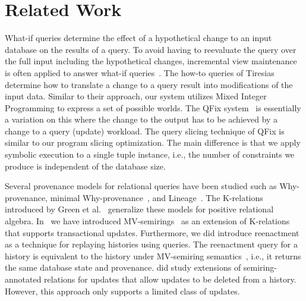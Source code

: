 \section{Related Work}
\label{sec:related-work}

%

% 
What-if queries determine the effect of a hypothetical change to an input database on the results of a query.
To avoid having to reevaluate the query over the full input including the hypothetical changes, incremental view maintenance is often applied to answer what-if queries~\cite{hung17,deutch13,ZG95,bourhis16}. %
The how-to queries of Tiresias~\cite{MeliouS12}  determine how to translate a  change
to a query result into modifications of the input data. Similar to their approach, our system utilizes
%
Mixed Integer Programming to express a set of possible worlds. %
The QFix system~\cite{wang16} is essentially a variation on this where the change to the output has to be achieved by a change to a query (update) workload.
The query slicing technique of QFix is similar to our program slicing optimization. The main difference is that
we apply symbolic execution to a single tuple instance, i.e.,
the number of constraints we produce is independent of the database size.
% 
%
%

% 
% 
Several provenance models for relational queries have been studied such as Why-provenance, minimal Why-provenance~\cite{BK01}, and Lineage~\cite{CW00b}. The K-relations introduced by Green et al.~\cite{GK07} generalize these models for positive relational algebra.
%
%
%
%
%
In~\cite{AG14,AG17,AG18} we have introduced  MV-semirings~\cite{AG14,AG17,AG18} as an extension of K-relations that supports transactional updates. Furthermore, we did introduce reenactment as a technique for replaying histories using queries. The reenactment query for a history is equivalent to the  history under MV-semiring semantics~\cite{AG14,AG17,AG18}, i.e., it returns the same database state and provenance. \cite{bourhis-20-eqinalphupq} did study extensions of semiring-annotated relations for updates that allow updates to be deleted from a history. However, this approach only supports a limited class of updates.
%

